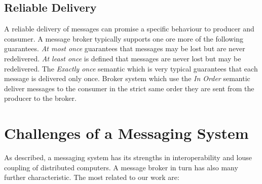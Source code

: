 \subsection{Reliable Delivery}
A reliable delivery of messages can promise a specific behaviour to producer
    and consumer. A message broker typically supports one ore more of the
    following guarantees.
    \textit{At most once} guarantees that messages may be lost but are never
    redelivered. \textit{At least once} is defined that messages are never lost
    but may be redelivered. The \textit{Exactly once} semantic which is very
    typical guarantees that each message is delivered only once. Broker system
    which use the \textit{In Order} semantic deliver messages to the consumer in
    the strict same order they are sent from the producer to the broker. 

\section{Challenges of a Messaging System}
\label{intro-messaging-characteristics}
As described, a messaging system has its strengths in interoperability and louse
coupling of distributed computers. 
A message broker in turn has also many further
characteristic. The most related to our work are:

